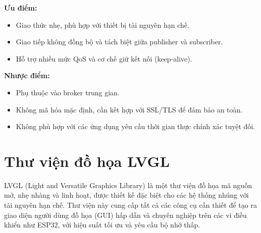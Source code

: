 \textbf{Ưu điểm:}
\begin{itemize}
    \item Giao thức nhẹ, phù hợp với thiết bị tài nguyên hạn chế.
    \item Giao tiếp không đồng bộ và tách biệt giữa publisher và subscriber.
    \item Hỗ trợ nhiều mức QoS và cơ chế giữ kết nối (keep-alive).
\end{itemize}

\textbf{Nhược điểm:}
\begin{itemize}
    \item Phụ thuộc vào broker trung gian.
    \item Không mã hóa mặc định, cần kết hợp với SSL/TLS để đảm bảo an toàn.
    \item Không phù hợp với các ứng dụng yêu cầu thời gian thực chính xác tuyệt đối.
\end{itemize}

\section{Thư viện đồ họa LVGL}
\tab LVGL (Light and Versatile Graphics Library) là một thư viện đồ họa mã nguồn mở, nhẹ nhàng và linh hoạt, được thiết kế đặc biệt cho các hệ thống nhúng với tài nguyên hạn chế. Thư viện này cung cấp tất cả các công cụ cần thiết để tạo ra giao diện người dùng đồ họa (GUI) hấp dẫn và chuyên nghiệp trên các vi điều khiển như ESP32, với hiệu suất tối ưu và yêu cầu bộ nhớ thấp.
